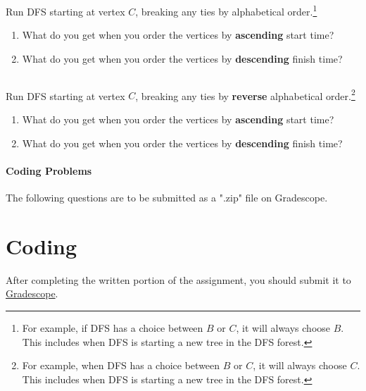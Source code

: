 \documentclass [12pt]{article}
\begin{document}
Run DFS starting at vertex $C$, breaking any ties by alphabetical order.\footnote {For example, if DFS has a choice between $B$ or $C$, it will always choose $B$. This includes when DFS is starting a new tree in the DFS forest.}

\begin{enumerate}[label=(\alph *)]
    \item What do you get when you order the vertices by \textbf {ascending} start time?
    \item What do you get when you order the vertices by \textbf {descending} finish time?
\end{enumerate} 

\subsection {}

Run DFS starting at vertex $C$, breaking any ties by \textbf {reverse} alphabetical order.\footnote {For example, when DFS has a choice between $B$ or $C$, it will always choose $C$. This includes when DFS is starting a new tree in the DFS forest.}

\begin{enumerate}[label=(\alph *)]
    \item What do you get when you order the vertices by \textbf {ascending} start time?
    \item What do you get when you order the vertices by \textbf {descending} finish time?
\end{enumerate} 


\begin{Instruction}

\paragraph{Coding Problems} The following questions are to be submitted as a ".zip" file on Gradescope. 

\end{Instruction}

\section{Coding }
After completing the written portion of the assignment, you should submit it to \href{https://www.gradescope.com/courses/350304}{Gradescope}.
\end{document}
